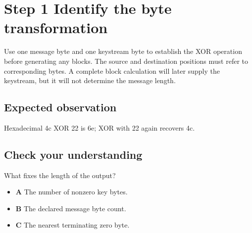 \section{Step 1 Identify the byte transformation}\label{chacha-s01}

Use one message byte and one keystream byte to establish the XOR operation before generating any blocks. The source and destination positions must refer to corresponding bytes. A complete block calculation will later supply the keystream, but it will not determine the message length.

\subsection{Expected observation}
Hexadecimal 4c XOR 22 is 6e; XOR with 22 again recovers 4c.

\subsection{Check your understanding}
What fixes the length of the output?

\begin{itemize}
  \item \textbf{A} The number of nonzero key bytes.
  \item \textbf{B} The declared message byte count.
  \item \textbf{C} The nearest terminating zero byte.
\end{itemize}
